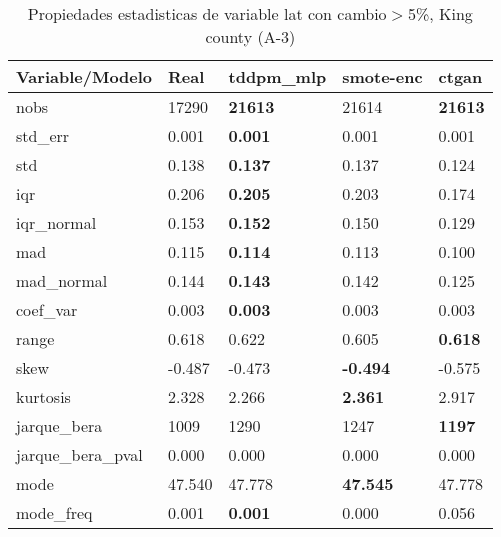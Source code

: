 \begin{table}[H]
\centering
\fontsize{8}{14}\selectfont
\caption{Propiedades estadisticas de variable lat con cambio\ensuremath{>}5\%, King county (A-3)}
\label{table-stats-king county-a-3-lat-short}
\begin{tabular}{|l|m{10em}|m{10em}|m{10em}|m{10em}|}
\hline
 \rowcolor[gray]{0.8}
Variable/Modelo & Real & tddpm\_mlp & smote-enc & ctgan \\
\hline nobs & 17290 & \bfseries 21613 & \cellcolor[rgb]{0.9, 0.54, 0.52} 21614 & \bfseries 21613 \\
\hline std\_err & 0.001 & \bfseries 0.001 & 0.001 & \cellcolor[rgb]{0.9, 0.54, 0.52} 0.001 \\
\hline std & 0.138 & \bfseries 0.137 & 0.137 & \cellcolor[rgb]{0.9, 0.54, 0.52} 0.124 \\
\hline iqr & 0.206 & \bfseries 0.205 & 0.203 & \cellcolor[rgb]{0.9, 0.54, 0.52} 0.174 \\
\hline iqr\_normal & 0.153 & \bfseries 0.152 & 0.150 & \cellcolor[rgb]{0.9, 0.54, 0.52} 0.129 \\
\hline mad & 0.115 & \bfseries 0.114 & 0.113 & \cellcolor[rgb]{0.9, 0.54, 0.52} 0.100 \\
\hline mad\_normal & 0.144 & \bfseries 0.143 & 0.142 & \cellcolor[rgb]{0.9, 0.54, 0.52} 0.125 \\
\hline coef\_var & 0.003 & \bfseries 0.003 & 0.003 & \cellcolor[rgb]{0.9, 0.54, 0.52} 0.003 \\
\hline range & 0.618 & 0.622 & \cellcolor[rgb]{0.9, 0.54, 0.52} 0.605 & \bfseries 0.618 \\
\hline skew & -0.487 & -0.473 & \bfseries -0.494 & \cellcolor[rgb]{0.9, 0.54, 0.52} -0.575 \\
\hline kurtosis & 2.328 & 2.266 & \bfseries 2.361 & \cellcolor[rgb]{0.9, 0.54, 0.52} 2.917 \\
\hline jarque\_bera & 1009 & \cellcolor[rgb]{0.9, 0.54, 0.52} 1290 & 1247 & \bfseries 1197 \\
\hline jarque\_bera\_pval & 0.000 & 0.000 & 0.000 & 0.000 \\
\hline mode & 47.540 & \cellcolor[rgb]{0.9, 0.54, 0.52} 47.778 & \bfseries 47.545 & \cellcolor[rgb]{0.9, 0.54, 0.52} 47.778 \\
\hline mode\_freq & 0.001 & \bfseries 0.001 & 0.000 & \cellcolor[rgb]{0.9, 0.54, 0.52} 0.056 \\
\hline
\end{tabular}
\end{table}
